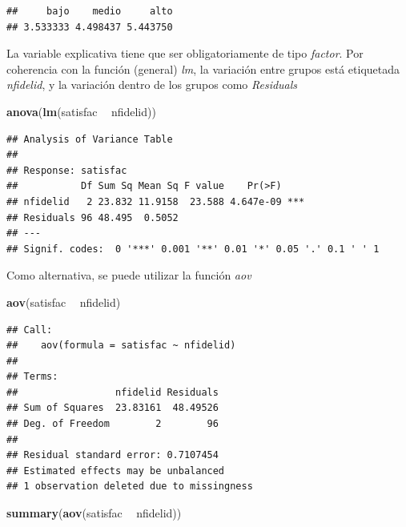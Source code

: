 \documentclass[]{book}
\newenvironment{Shaded}{\begin{snugshade}}{\end{snugshade}}
\newcommand{\KeywordTok}[1]{\textcolor[rgb]{0.13,0.29,0.53}{\textbf{#1}}}
\newcommand{\StringTok}[1]{\textcolor[rgb]{0.31,0.60,0.02}{#1}}
\newcommand{\OperatorTok}[1]{\textcolor[rgb]{0.81,0.36,0.00}{\textbf{#1}}}
\newcommand{\NormalTok}[1]{#1}
\begin{document}
\begin{verbatim}
##     bajo    medio     alto 
## 3.533333 4.498437 5.443750
\end{verbatim}

La variable explicativa tiene que ser obligatoriamente de tipo
\emph{factor}. Por coherencia con la función (general) \emph{lm}, la
variación entre grupos está etiquetada \emph{nfidelid}, y la variación
dentro de los grupos como \emph{Residuals}

\begin{Shaded}
\begin{Highlighting}[]
\KeywordTok{anova}\NormalTok{(}\KeywordTok{lm}\NormalTok{(satisfac }\OperatorTok{~}\StringTok{ }\NormalTok{nfidelid))}
\end{Highlighting}
\end{Shaded}

\begin{verbatim}
## Analysis of Variance Table
## 
## Response: satisfac
##           Df Sum Sq Mean Sq F value    Pr(>F)    
## nfidelid   2 23.832 11.9158  23.588 4.647e-09 ***
## Residuals 96 48.495  0.5052                      
## ---
## Signif. codes:  0 '***' 0.001 '**' 0.01 '*' 0.05 '.' 0.1 ' ' 1
\end{verbatim}

Como alternativa, se puede utilizar la función \emph{aov}

\begin{Shaded}
\begin{Highlighting}[]
\KeywordTok{aov}\NormalTok{(satisfac }\OperatorTok{~}\StringTok{ }\NormalTok{nfidelid)}
\end{Highlighting}
\end{Shaded}

\begin{verbatim}
## Call:
##    aov(formula = satisfac ~ nfidelid)
## 
## Terms:
##                 nfidelid Residuals
## Sum of Squares  23.83161  48.49526
## Deg. of Freedom        2        96
## 
## Residual standard error: 0.7107454
## Estimated effects may be unbalanced
## 1 observation deleted due to missingness
\end{verbatim}

\begin{Shaded}
\begin{Highlighting}[]
\KeywordTok{summary}\NormalTok{(}\KeywordTok{aov}\NormalTok{(satisfac }\OperatorTok{~}\StringTok{ }\NormalTok{nfidelid))}
\end{Highlighting}
\end{Shaded}
\end{document}
